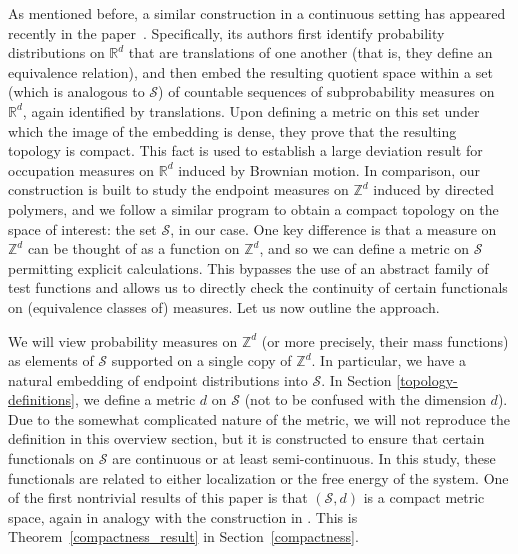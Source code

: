 \documentclass[11pt,reqno]{amsart}
\numberwithin{equation}{section}
\theoremstyle{definition}
\begin{document}
As mentioned before, a similar construction in a continuous setting has appeared recently in the paper~\cite{mukherjee-varadhan14}.
Specifically, its authors first identify probability distributions on ${\mathbb{R}}^d$ that are translations of one another (that is, they define an equivalence relation), and then embed the resulting quotient space within a set (which is analogous to ${\mathcal{S}}$) of countable sequences of subprobability measures on ${\mathbb{R}}^d$, again identified by translations.
Upon defining a metric on this set under which the image of the embedding is dense, they prove that the resulting topology is compact.
This fact is used to establish a large deviation result for occupation measures on ${\mathbb{R}}^d$ induced by Brownian motion.
In comparison, our construction is built to study the endpoint measures on ${\mathbb{Z}}^d$ induced by directed polymers, and we follow a similar program to obtain a compact topology on the space of interest: the set ${\mathcal{S}}$, in our case.
One key difference is that a measure on ${\mathbb{Z}}^d$ can be thought of as a function on ${\mathbb{Z}}^d$, and so we can define a metric on ${\mathcal{S}}$ permitting explicit calculations. 
This bypasses the use of an abstract family of test functions and allows us to directly check the continuity of certain functionals on (equivalence classes of) measures.
Let us now outline the approach.

We will view probability measures on ${\mathbb{Z}}^d$ (or more precisely, their mass functions) as elements of ${\mathcal{S}}$ supported on a single copy of ${\mathbb{Z}}^d$.
In particular, we have a natural embedding of endpoint distributions into ${\mathcal{S}}$.
In Section \ref{topology-definitions}, we define a metric $d$ on ${\mathcal{S}}$ (not to be confused with the dimension $d$).
Due to the somewhat complicated nature of the metric, we will not reproduce the definition in this overview section, but it is constructed to ensure that certain functionals on ${\mathcal{S}}$ are continuous or at least semi-continuous.
In this study, these functionals are related to either localization or the free energy of the system.
One of the first nontrivial results of this paper is that $({\mathcal{S}}, d)$ is a compact metric space, again in analogy with the construction in \cite{mukherjee-varadhan14}. 
This is Theorem~\ref{compactness_result} in Section~\ref{compactness}.
\end{document}
